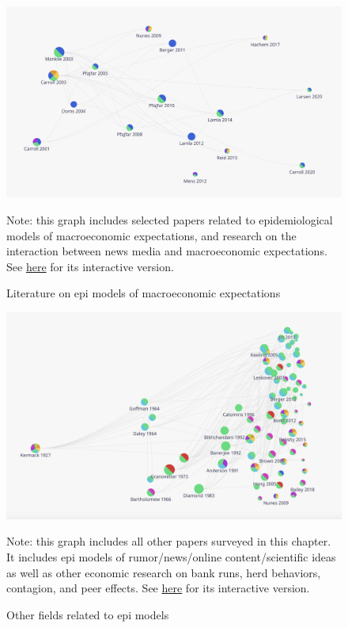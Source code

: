 \newpage

\begin{figure}[!ht] \centering  %
    \hypertarget{graphmacro}{}
		\caption{Literature on epi models of macroeconomic expectations}
	\label{fig:graphmacro}
	\centerline{\includegraphics[width=\textwidth]{./figures/graph_macro.png}}
				\begin{flushleft}
		{\footnotesize Note: this graph includes selected papers related to epidemiological models of macroeconomic expectations, and research on the interaction between news media and macroeconomic expectations. See \href{https://app.litmaps.co/shared/289F57F4-FDE5-4F94-B1A9-2BA7419DB719}{here} for its interactive version.}
							\end{flushleft}
\end{figure}


\newpage

\begin{figure}[!ht] \centering  %
	\caption{Other fields related to epi models}
	\label{fig:graph_other}
	\centerline{\includegraphics[width=\textwidth]{./figures/graph_other.png}}
	{\footnotesize Note: this graph includes all other papers surveyed in this chapter. It includes epi models of rumor/news/online content/scientific ideas as well as other economic research on bank runs, herd behaviors, contagion, and peer effects. See \href{https://app.litmaps.co/shared/B5FA1F14-01A8-4C9D-BF23-BE0F62293FAF}{here} for its interactive version.}
\end{figure}



